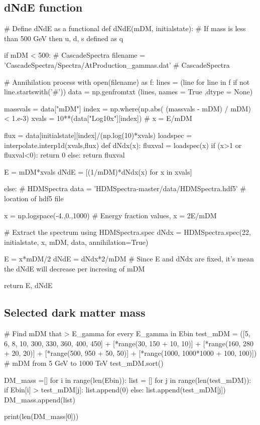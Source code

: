 \documentclass[10pt, oneside]{book}
\numberwithin{equation}{chapter}
\begin{document}
\subsection{dNdE function}
\begin{python}
# Define dNdE as a functional
def dNdE(mDM, initialstate):
    # If mass is less than 500 GeV then u, d, s defined as q

    if mDM < 500:   # CascadeSpectra
        filename = 'CascadeSpectra/Spectra/AtProduction_gammas.dat' # CascadeSpectra

        # Annihilation process
        with open(filename) as f:
            lines = (line for line in f if not line.startswith('#'))
            data = np.genfromtxt (lines, names = True ,dtype = None)

        massvals = data["mDM"]
        index = np.where(np.abs( (massvals - mDM) / mDM) < 1.e-3)
        xvals = 10**(data["Log10x"][index]) # x = E/mDM

        flux = data[initialstate][index]/(np.log(10)*xvals)
        loadspec = interpolate.interp1d(xvals,flux)
        def dNdx(x):
            fluxval = loadspec(x)
            if (x>1 or fluxval<0):
                return 0
            else:
                return fluxval

        E = mDM*xvals
        dNdE = [(1/mDM)*dNdx(x) for x in xvals]

    else:   # HDMSpectra
        data = 'HDMSpectra-master/data/HDMSpectra.hdf5' # location of hdf5 file

        x = np.logspace(-4.,0.,1000) # Energy fraction values, x = 2E/mDM

        # Extract the spectrum using HDMSpectra.spec
        dNdx = HDMSpectra.spec(22, initialstate, x, mDM, data, annihilation=True)

        E = x*mDM/2
        dNdE = dNdx*2/mDM # Since E and dNdx are fixed, it's mean the dNdE will decrease per incresing of mDM

    return E, dNdE
\end{python}

\subsection{Selected dark matter mass}
\begin{python}
# Find mDM that > E_gamma for every E_gamma in Ebin
test_mDM = ([5, 6, 8, 10, 300, 330, 360, 400, 450]
          + [*range(30, 150 + 10, 10)]
          + [*range(160, 280 + 20, 20)]
          + [*range(500, 950 + 50, 50)]
          + [*range(1000, 1000*1000 + 100, 100)]) # mDM from 5 GeV to 1000 TeV
test_mDM.sort()

DM_mass =[]
for i in range(len(Ebin)):
    list = []
    for j in range(len(test_mDM)):
        if Ebin[i] > test_mDM[j]:
            list.append(0)
        else:
            list.append(test_mDM[j])
    DM_mass.append(list)

print(len(DM_mass[0]))
\end{python}
\end{document}
